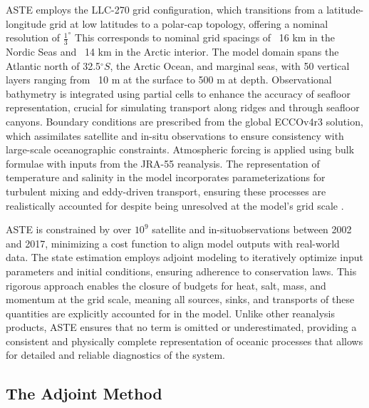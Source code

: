 \documentclass[draft]{agujournal2019}
\begin{document}
ASTE employs the LLC-270 grid configuration, which transitions from a latitude-longitude grid at low latitudes to a polar-cap topology, offering a nominal resolution of $\frac{1}{3}^\circ$ This corresponds to nominal grid spacings of ~16 km in the Nordic Seas and ~14 km in the Arctic interior. The model domain spans the Atlantic north of 32.5$^\circ S$, the Arctic Ocean, and marginal seas, with 50 vertical layers ranging from ~10 m at the surface to 500 m at depth. Observational bathymetry is integrated using partial cells to enhance the accuracy of seafloor representation, crucial for simulating transport along ridges and through seafloor canyons. Boundary conditions are prescribed from the global ECCOv4r3 solution, which assimilates satellite and in-situ observations to ensure consistency with large-scale oceanographic constraints. Atmospheric forcing is applied using bulk formulae with inputs from the JRA-55 reanalysis. The representation of temperature and salinity in the model incorporates parameterizations for turbulent mixing and eddy-driven transport, ensuring these processes are realistically accounted for despite being unresolved at the model's grid scale .

ASTE is constrained by over $10^9$ satellite and in-situobservations between 2002 and 2017, minimizing a cost function to align model outputs with real-world data. The state estimation employs adjoint modeling to iteratively optimize input parameters and initial conditions, ensuring adherence to conservation laws. This rigorous approach enables the closure of budgets for heat, salt, mass, and momentum at the grid scale, meaning all sources, sinks, and transports of these quantities are explicitly accounted for in the model. Unlike other reanalysis products, ASTE ensures that no term is omitted or underestimated, providing a consistent and physically complete representation of oceanic processes that allows for detailed and reliable diagnostics of the system.

\subsection{The Adjoint Method}
\end{document}
